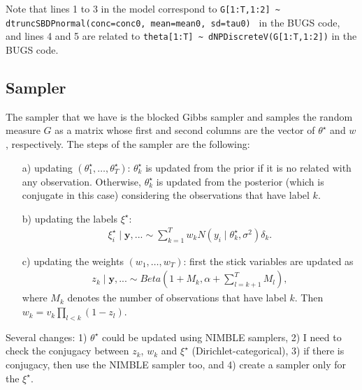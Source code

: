 \documentclass[12pt]{article}
\begin{document}
Note that lines 1 to 3 in the model correspond to \texttt{G[1:T,1:2] \~{} dtruncSBDPnormal(conc=conc0, mean=mean0, sd=tau0) } in the BUGS code, and lines 4 and 5 are related  to \texttt{theta[1:T] \~{} dNPDiscreteV(G[1:T,1:2])} in the BUGS code.

\subsection{Sampler}
The sampler that we have is the blocked Gibbs sampler and samples the random measure $G$ as a matrix whose first and second columns are the vector of $\theta^{\star}$ and $w$, respectively. The steps of the sampler are the following:
\begin{itemize}
\item[a)] updating $(\theta^{\star}_1, \ldots, \theta^{\star}_T)$: $\theta^{\star}_k$ is updated from the prior if it is no related with any observation. Otherwise, $\theta^{\star}_k$ is updated from the posterior (which is conjugate in this case) considering the observations that have label $k$. 
\item[b)] updating the labels $\xi^{\star}$: 
\begin{align*}
\xi^{\star}_i\mid \boldsymbol{y}, ...\sim \sum_{k=1}^T w_kN(y_i\mid \theta^{\star}_k, \sigma^2)\delta_k.
\end{align*}
\item[c)] updating the weights $(w_1, \ldots, w_T)$: first the stick variables are updated as \begin{align*}
z_k\mid \boldsymbol{y}, ... \sim Beta \left(1 + M_k, \alpha+\sum_{l=k+1}^TM_l\right),
\end{align*}
where $M_k$ denotes the number of observations that  have label $k$. Then $w_k=v_k\prod_{l<k}(1-z_l)$.
\end{itemize}

Several changes: 1) $\theta^{\star}$ could be updated using NIMBLE samplers, 2) I need to check the conjugacy between $z_k$, $w_k$ and $\xi^{\star}$ (Dirichlet-categorical), 3) if there is conjugacy, then use the NIMBLE sampler too, and 4) create a sampler only for the $\xi^{\star}$. 



\end{document}
